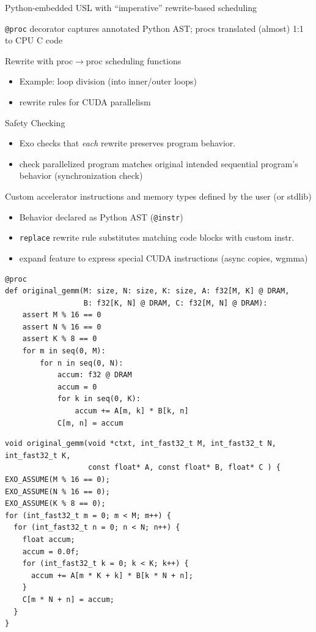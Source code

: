 \begin{minipage}[t]{0.5\textwidth}\fixminipage
{} Python-embedded USL with ``imperative'' rewrite-based scheduling

\texttt{@proc} decorator captures annotated Python AST; procs translated (almost) 1:1 to CPU C code

Rewrite with proc$\to$proc scheduling functions
\begin{itemize}
  \item Example: loop division (into inner/outer loops)
  \item {} rewrite rules for CUDA parallelism
\end{itemize}
Safety Checking
\begin{itemize}
  \item Exo checks that \textit{each} rewrite preserves program behavior.
  \item {} check parallelized program matches original intended sequential program's behavior (synchronization check)
\end{itemize}
Custom accelerator instructions and memory types defined by the user (or stdlib)
\begin{itemize}
  \item Behavior declared as Python AST (\texttt{@instr})
  \item \texttt{replace} rewrite rule substitutes matching code blocks with custom instr.
  \item {} expand feature to express special CUDA instructions (async copies, wgmma)
\end{itemize}
\end{minipage} %
\hfill
\begin{minipage}[t]{0.5\textwidth}\fixminipage
{}
\vspace{3mm}
{
\tiny
\begin{verbatim}
@proc
def original_gemm(M: size, N: size, K: size, A: f32[M, K] @ DRAM,
                  B: f32[K, N] @ DRAM, C: f32[M, N] @ DRAM):
    assert M % 16 == 0
    assert N % 16 == 0
    assert K % 8 == 0
    for m in seq(0, M):
        for n in seq(0, N):
            accum: f32 @ DRAM
            accum = 0
            for k in seq(0, K):
                accum += A[m, k] * B[k, n]
            C[m, n] = accum
\end{verbatim}
}
\vspace{1cm}
\vspace{3mm}
{
\tiny
\begin{verbatim}
void original_gemm(void *ctxt, int_fast32_t M, int_fast32_t N, int_fast32_t K,
                   const float* A, const float* B, float* C ) {
EXO_ASSUME(M % 16 == 0);
EXO_ASSUME(N % 16 == 0);
EXO_ASSUME(K % 8 == 0);
for (int_fast32_t m = 0; m < M; m++) {
  for (int_fast32_t n = 0; n < N; n++) {
    float accum;
    accum = 0.0f;
    for (int_fast32_t k = 0; k < K; k++) {
      accum += A[m * K + k] * B[k * N + n];
    }
    C[m * N + n] = accum;
  }
}
\end{verbatim}
}
\end{minipage} %
\vfill
\newpage
{}

